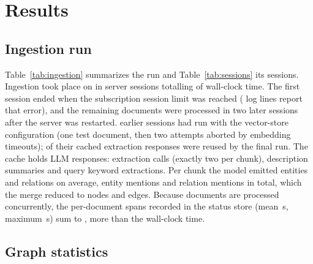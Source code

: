 \documentclass[lettersize,journal]{IEEEtran}
\begin{document}
\section{Results}
\label{sec:results}

\subsection{Ingestion run}

Table~\ref{tab:ingestion} summarizes the run and Table~\ref{tab:sessions} its sessions. Ingestion took place on \ingestionDate{} in \nIngestionSessions{} server sessions totalling \ingestionWall{} of wall-clock time. The first session ended when the subscription session limit was reached (\nSessionLimitLines{} log lines report that error), and the remaining documents were processed in two later sessions after the server was restarted. \nAbortedSessions{} earlier sessions had run with the vector-store configuration (one test document, then two attempts aborted by embedding timeouts); \nCacheExtractReused{} of their cached extraction responses were reused by the final run. The cache holds \nCacheTotal{} LLM responses: \nCacheExtract{} extraction calls (exactly two per chunk), \nCacheSummary{} description summaries and \nCacheKeywords{} query keyword extractions. Per chunk the model emitted \meanEntitiesChunk{} entities and \meanRelationsChunk{} relations on average, \entitiesLogged{} entity mentions and \relationsLogged{} relation mentions in total, which the merge reduced to \nNodes{} nodes and \nEdges{} edges. Because documents are processed concurrently, the per-document spans recorded in the status store (mean \perDocWallMean\,s, maximum \perDocWallMax\,s) sum to \perDocWallSum{}, more than the wall-clock time.




\subsection{Graph statistics}
\end{document}
